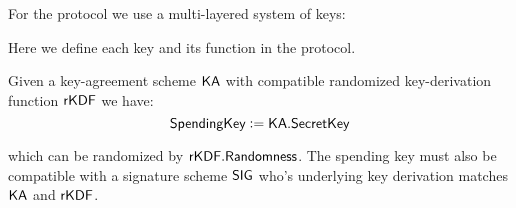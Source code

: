
For the \Transfer{} protocol we use a multi-layered system of keys:

\begin{center}
    \vspace{1em}
    \begin{mdframed}[leftmargin=0.125\textwidth, rightmargin=0.125\textwidth]
        \begin{center}
        \end{center}
    \end{mdframed}
    \vspace{-1em}
\end{center}

Here we define each key and its function in the \Transfer{} protocol.

\begin{definition}
    Given a key-agreement scheme ${\textsf{KA}}$ with compatible randomized key-derivation function ${\textsf{rKDF}}$ we have:
    \[{\textsf{SpendingKey}} := {\textsf{KA}}.{\textsf{SecretKey}}\]

    which can be randomized by ${\textsf{rKDF}}.{\textsf{Randomness}}$. The spending key must also be compatible with a signature scheme ${\textsf{SIG}}$ who's underlying key derivation matches ${\textsf{KA}}$ and ${\textsf{rKDF}}$. 
\end{definition}

